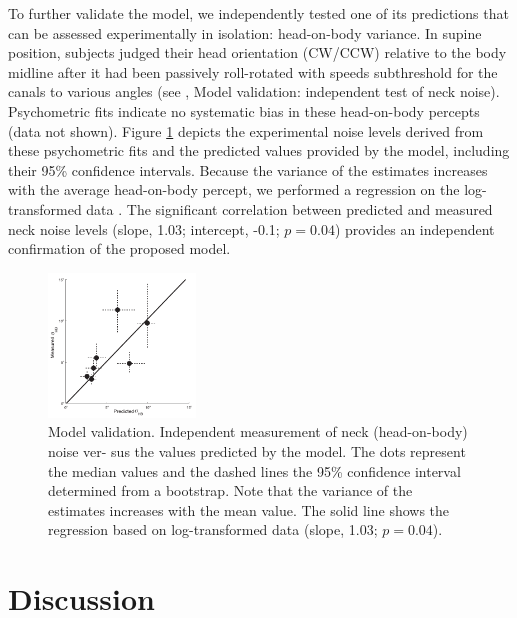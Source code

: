 To further validate the model, we independently tested one of its predictions that can be assessed experimentally in isolation: head-on-body variance. In supine position, subjects judged their head orientation (CW/CCW) relative to the body midline after it had been passively roll-rotated with speeds subthreshold for the canals to various angles (see , Model validation: independent test of neck noise). Psychometric fits indicate no systematic bias in these head-on-body percepts (data not shown). Figure \ref{p1:fig6} depicts the experimental noise levels derived from these psychometric fits and the predicted values provided by the model, including their 95\% confidence intervals. Because the variance of the estimates increases with the average head-on-body percept, we performed a regression on the log-transformed data \cite{hopkins2000}. The significant correlation between predicted and measured neck noise levels (slope, 1.03; intercept, -0.1; $p = 0.04$) provides an independent confirmation of the proposed model.

\begin{figure}
    \includegraphics[width=0.35\textwidth]{src/paper1/figure6.pdf}
    
    \caption{Model validation. Independent measurement of neck (head-on-body) noise ver- sus the values predicted by the model. The dots represent the median values and the dashed lines the 95\% confidence interval determined from a bootstrap. Note that the variance of the estimates increases with the mean value. The solid line shows the regression based on log-transformed data (slope, 1.03; $p = 0.04$).}

    \label{p1:fig6}
\end{figure}



\section{Discussion}

